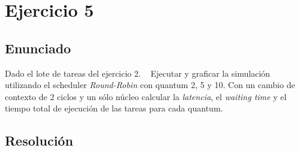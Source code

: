 \section{Ejercicio 5}

\subsection{Enunciado}
Dado el lote de tareas del ejercicio 2.
~
Ejecutar y graficar la simulación utilizando el scheduler \textit{Round-Robin} con quantum 2, 5 y 10.
Con un cambio de contexto de 2 ciclos y un sólo núcleo calcular la \textit{latencia}, el \textit{waiting time} y el tiempo total de ejecución de las tareas para cada quantum.


\subsection{Resolución}